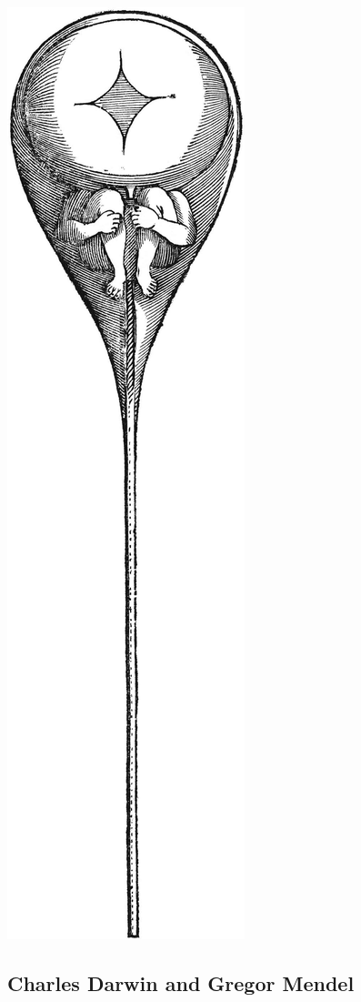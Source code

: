 \documentclass[
  9pt,
]{book}
\begin{document}
\includegraphics[width=0.5\linewidth]{figs/introduction/homunculus}

\hypertarget{charles-darwin-and-gregor-mendel}{%
\subsection{Charles Darwin and Gregor Mendel}\label{charles-darwin-and-gregor-mendel}}
\end{document}
